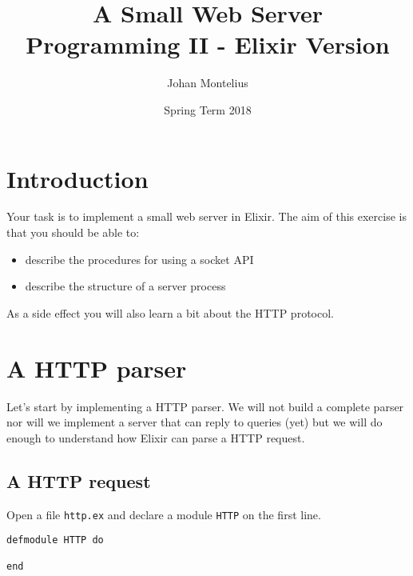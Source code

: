 \documentclass[a4paper,11pt]{article}
\begin{document}

\title{
    \textbf{A Small Web Server}\\
    \large{Programming II - Elixir Version}
}
\author{Johan Montelius}
\date{Spring Term 2018}
\maketitle
{}



\section*{Introduction}

Your task is to implement a small web server in Elixir. The aim of
this exercise is that you should be able to:

\begin{itemize}
\item describe the procedures for using a socket API
\item describe the structure of a server process
\end{itemize}

As a side effect you will also learn a bit about the HTTP protocol.



\section{A HTTP parser}

Let's start by implementing a HTTP parser. We will not build a
complete parser nor will we implement a server that can reply to 
queries (yet) but we will do enough to understand how Elixir can 
parse a HTTP request.

\subsection{A HTTP request}
Open a file {\tt http.ex} and declare a module {\tt HTTP} on the
first line.

\begin{verbatim}
defmodule HTTP do
  
end
\end{verbatim}
\end{document}
